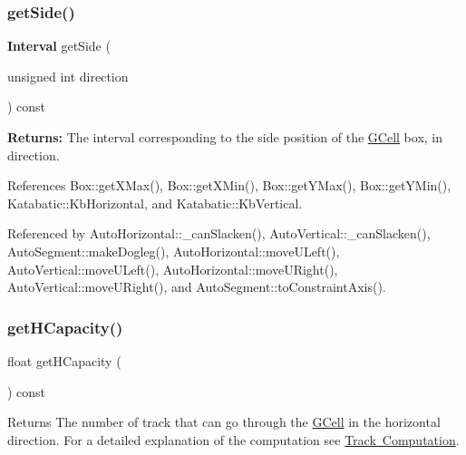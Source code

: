 \mbox{\label{classKatabatic_1_1GCell_a10f3dd5001b2015e34a9aacdacf6eae6}} 
\subsubsection{\texorpdfstring{get\+Side()}{getSide()}}
{\footnotesize\ttfamily \textbf{ Interval} get\+Side (\begin{DoxyParamCaption}\item[{unsigned int}]{direction }\end{DoxyParamCaption}) const}

{\bfseries Returns\+:} The interval corresponding to the side position of the \mbox{\hyperlink{classKatabatic_1_1GCell}{G\+Cell}} box, in {\ttfamily direction}. 

References Box\+::get\+X\+Max(), Box\+::get\+X\+Min(), Box\+::get\+Y\+Max(), Box\+::get\+Y\+Min(), Katabatic\+::\+Kb\+Horizontal, and Katabatic\+::\+Kb\+Vertical.



Referenced by Auto\+Horizontal\+::\+\_\+can\+Slacken(), Auto\+Vertical\+::\+\_\+can\+Slacken(), Auto\+Segment\+::make\+Dogleg(), Auto\+Horizontal\+::move\+U\+Left(), Auto\+Vertical\+::move\+U\+Left(), Auto\+Horizontal\+::move\+U\+Right(), Auto\+Vertical\+::move\+U\+Right(), and Auto\+Segment\+::to\+Constraint\+Axis().

\mbox{\label{classKatabatic_1_1GCell_ad0dda8d59162b90040263fc55d7da714}} 
\subsubsection{\texorpdfstring{get\+H\+Capacity()}{getHCapacity()}}
{\footnotesize\ttfamily float get\+H\+Capacity (\begin{DoxyParamCaption}{ }\end{DoxyParamCaption}) const}

\begin{DoxyReturn}{Returns}
The number of track that can go through the \mbox{\hyperlink{classKatabatic_1_1GCell}{G\+Cell}} in the horizontal direction. For a detailed explanation of the computation see \mbox{\hyperlink{classKatabatic_1_1GCell_secGCellTrackComputation}{Track Computation}}. 
\end{DoxyReturn}


